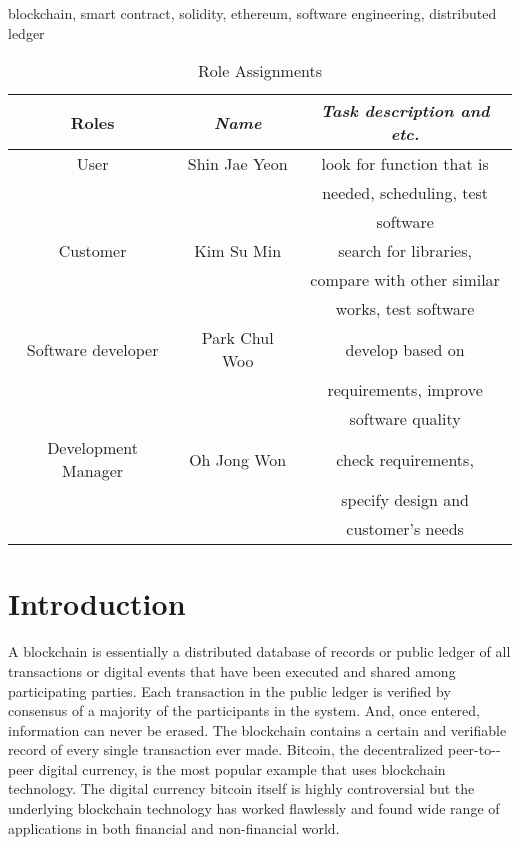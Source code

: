\documentclass[conference]{IEEEtran}
\begin{document}
\begin{IEEEkeywords}
blockchain, smart contract,  solidity, ethereum, software engineering, distributed ledger
\end{IEEEkeywords}

\begin{table}[htbp]
\caption{Role Assignments}
\begin{center}
\begin{tabular}{|c|c|c|}
\hline
\textbf{Roles} & \textbf{\textit{Name}}& \textbf{\textit{Task description and etc.}} \\
\hline
User & Shin Jae Yeon &look for function that is\\
& & needed, scheduling, test \\
& &  software\\
\hline
Customer & Kim Su Min & search for libraries, \\
& & compare with other similar\\
& & works, test software\\
\hline
Software developer& Park Chul Woo & develop based on\\
 & & requirements, improve \\
  & & software quality \\
\hline
Development Manager & Oh Jong Won & check requirements,\\
 & & specify design and\\
 & & customer's needs\\
\hline
\end{tabular}
\label{tab1}
\end{center}
\end{table}

\section{Introduction}
A blockchain is essentially a distributed database of records or public ledger of all transactions or
digital events that have been executed and shared among participating parties. Each transaction in
the public ledger is verified by consensus of a majority of the participants in the system. And, once
entered, information can never be erased. The blockchain contains a certain and verifiable record of
every single transaction ever made. Bitcoin, the decentralized peer­-to-­peer digital currency, is the
most popular example that uses blockchain technology. The digital currency bitcoin itself is highly
controversial but the underlying blockchain technology has worked flawlessly and found wide range of
applications in both financial and non-­financial world.
\end{document}
